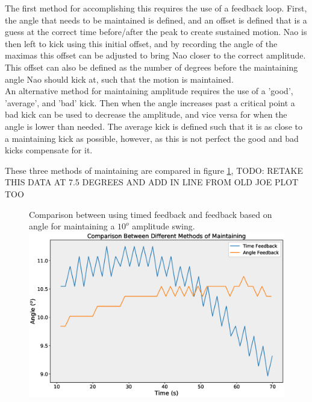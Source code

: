 \documentclass[11pt]{article}
\begin{document}
The first method for accomplishing this requires the use of a feedback loop. First, the angle that needs to be maintained is defined, and an offset is defined that is a guess at the correct time before/after the peak to create sustained motion. Nao is then left to kick using this initial offset, and by recording the angle of the maximas this offset can be adjusted to bring Nao closer to the correct amplitude. This offset can also be defined as the number of degrees before the maintaining angle Nao should kick at, such that the motion is maintained.\\

An alternative method for maintaining amplitude requires the use of a 'good', 'average', and 'bad' kick. Then when the angle increases past a critical point a bad kick can be used to decrease the amplitude, and vice versa for when the angle is lower than needed. The average kick is defined such that it is as close to a maintaining kick as possible, however, as this is not perfect the good and bad kicks compensate for it.

These three methods of maintaining are compared in figure \ref{fig:MaintainFeedbackComparison}, TODO: RETAKE THIS DATA AT 7.5 DEGREES AND ADD IN LINE FROM OLD JOE PLOT TOO\\

    \begin{figure}[!htb]
        \centering
        \captionbox
             {Comparison between using timed feedback and feedback based on angle for maintaining a $10^o$ amplitude swing.\label{fig:MaintainFeedbackComparison}}
             {\includegraphics[width=1.0\textwidth]{MaintainFeedback.eps}}
    \end{figure}
    
\end{document}
